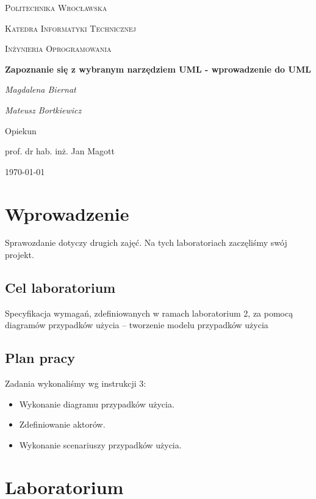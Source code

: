 \documentclass{article}
\begin{document}
	
	\begin{titlepage}
		\centering
		{\scshape\LARGE Politechnika Wrocławska \par}
		{\scshape\Large Katedra Informatyki Technicznej\par}
		
		\vspace{1cm}
		{\scshape\Large Inżynieria Oprogramowania\par}
		\vspace{1.5cm}
		{\huge\bfseries Zapoznanie się z wybranym narzędziem UML - wprowadzenie do UML\par}
		\vspace{2cm}
		{\Large\itshape Magdalena Biernat\par}
		{\Large\itshape Mateusz Bortkiewicz\par}
		\vfill
		Opiekun\par
		prof. dr hab. inż. Jan Magott 
		
		\vfill
		{\large \today\par}
	\end{titlepage}
	\newpage
	
	\section{Wprowadzenie}
	Sprawozdanie dotyczy drugich zajęć. Na tych laboratoriach zaczęliśmy swój projekt. 
	
	\subsection{Cel laboratorium}
Specyfikacja wymagań, zdefiniowanych w ramach laboratorium 2, za pomocą diagramów przypadków użycia – tworzenie modelu
przypadków użycia 
	
	\subsection{Plan pracy}
	Zadania wykonaliśmy wg instrukcji 3:
	\begin{itemize}
		\item Wykonanie diagramu przypadków użycia.
		\item Zdefiniowanie aktorów.
		\item Wykonanie scenariuszy przypadków użycia.
	\end{itemize}
\newpage
	\section{Laboratorium}
\end{document}
